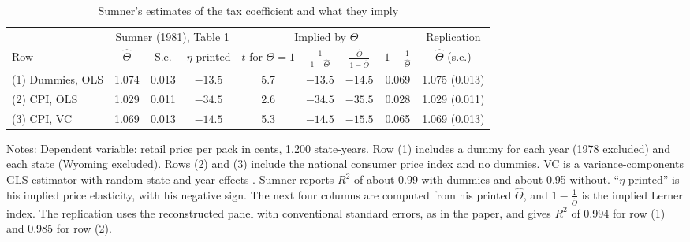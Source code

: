 \begin{table}[htbp]
\centering
\begin{threeparttable}
\caption{Sumner's estimates of the tax coefficient and what they imply}
\label{tab:C-sumner1}
\small
\setlength{\tabcolsep}{4.5pt}
\begin{tabular}{@{}lcccccccc@{}}
\toprule
 & \multicolumn{3}{c}{Sumner (1981), Table 1} & \multicolumn{4}{c}{Implied by $\hat\Theta$} & Replication \\
\cmidrule(lr){2-4}\cmidrule(lr){5-8}\cmidrule(l){9-9}
Row & $\hat\Theta$ & S.e. & $\eta$ printed & $t$ for $\Theta = 1$ & $\frac{1}{1 - \hat\Theta}$ &
  $\frac{\hat\Theta}{1 - \hat\Theta}$ & $1 - \frac{1}{\hat\Theta}$ & $\hat\Theta$ (s.e.) \\
\midrule
(1) Dummies, OLS & 1.074 & 0.013 & $-13.5$ & 5.7 & $-13.5$ & $-14.5$ & 0.069 & 1.075 (0.013) \\
(2) CPI, OLS & 1.029 & 0.011 & $-34.5$ & 2.6 & $-34.5$ & $-35.5$ & 0.028 & 1.029 (0.011) \\
(3) CPI, VC & 1.069 & 0.013 & $-14.5$ & 5.3 & $-14.5$ & $-15.5$ & 0.065 & 1.069 (0.013) \\
\bottomrule
\end{tabular}
\begin{tablenotes}\footnotesize
\item Notes: Dependent variable: retail price per pack in cents, 1,200 state-years. Row (1) includes a dummy for each
year (1978 excluded) and each state (Wyoming excluded). Rows (2) and (3) include the national consumer price index and
no dummies. VC is a variance-components GLS estimator with random state and year effects \citep{FullerBattese1974}.
Sumner reports $R^2$ of about 0.99 with dummies and about 0.95 without. ``$\eta$ printed'' is his implied price
elasticity, with his negative sign. The next four columns are computed from his printed $\hat\Theta$, and
$1 - \frac{1}{\hat\Theta}$ is the implied Lerner index. The replication uses the reconstructed panel with
conventional standard errors, as in the paper, and gives $R^2$ of 0.994 for row (1) and 0.985 for row (2).
\end{tablenotes}
\end{threeparttable}
\end{table}

